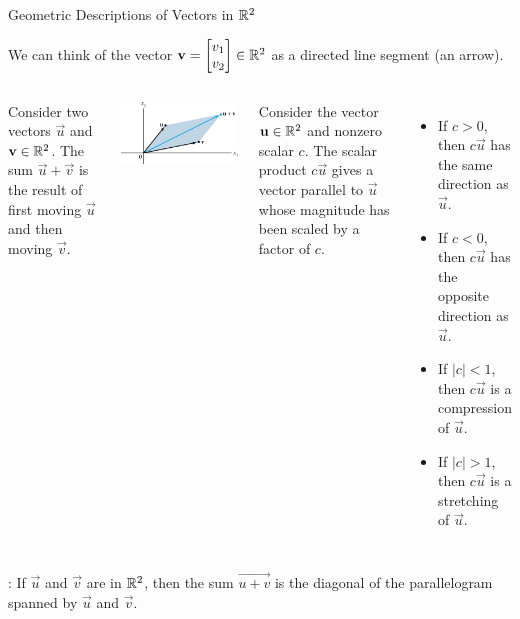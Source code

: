 \documentclass[xcoler=dvipsnames, aspectratio=169]{beamer}
\begin{document}
    \begin{frame}{Geometric Descriptions of Vectors in $\mathbb{R}^2$}
        \scriptsize
  

        {\small  We can think of the vector $\mathbf{v} = \begin{bmatrix} 
        v_1 \\ v_2 \end{bmatrix} \in \mathbb{R}^2$ as a directed line segment (an arrow).}

  \begin{columns}
    
 {\small Consider two vectors $\vec{u}$ and $\mathbf{v} \in \mathbb{R}^2$. The sum $\vec{u} + \vec{v}$ is  the result of first moving $\vec{u}$ and then moving $\vec{v}$.}

 \includegraphics[width=0.9\tw]{images/fig-add.png}

 \column{0.5\tw}

 {\small Consider the vector $\mathbf{u} \in \mathbb{R}^2$ and nonzero scalar $c$. The scalar product $c \vec{u}$ gives a vector parallel to $\vec{u}$ whose magnitude has been scaled by a factor of $c$.
      \begin{itemize}
 \item If $c > 0$,  then $c \vec{u}$ has the same direction as $\vec{u}$.
 \item If $c < 0$,  then $c \vec{u}$ has the opposite direction as $\vec{u}$.
\item If $|c| < 1$, then $c \vec{u}$ is a compression of $\vec{u}$.
\item If $|c| > 1$, then $c \vec{u}$ is a stretching of $\vec{u}$.
      \end{itemize} }

  \end{columns}
        \begin{tcolorbox}
{\small  {}: If $\vec{u}$ and $\vec{v}$ are in $\mathbb{R}^2$, then the sum $\vec{u+v}$ is the diagonal of the parallelogram spanned by $\vec{u}$ and $\vec{v}$. }
        \end{tcolorbox}
    \end{frame}
\end{document}

